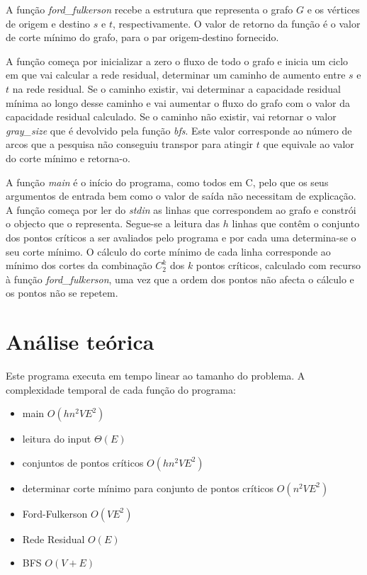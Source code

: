 \documentclass[12pt]{article}
\begin{document}
A função \emph{ford\_fulkerson} recebe a estrutura que representa o grafo $G$ e os vértices de origem e destino $s$ e $t$, respectivamente. O valor de retorno da função é o valor de corte mínimo do grafo, para o par origem-destino fornecido. 

A função começa por inicializar a zero o fluxo de todo o grafo e inicia um ciclo em que vai calcular a rede residual, determinar um caminho de aumento entre $s$ e $t$ na rede residual. Se o caminho existir, vai determinar a capacidade residual mínima ao longo desse caminho e vai aumentar o fluxo do grafo com o valor da capacidade residual calculado. Se o caminho não existir, vai retornar o valor \emph{gray\_size} que é devolvido pela função \emph{bfs}. Este valor corresponde ao número de arcos que a pesquisa não conseguiu transpor para atingir $t$ que equivale ao valor do corte mínimo e retorna-o.


A função \emph{main} é o início do programa, como todos em C, pelo que os seus argumentos de entrada bem como o valor de saída não necessitam de explicação. A função começa por ler do \emph{stdin} as linhas que correspondem ao grafo e constrói o objecto que o representa. 
Segue-se a leitura das $h$ linhas que contêm o conjunto dos pontos críticos a ser avaliados pelo programa e por cada uma determina-se o seu corte mínimo. 
O cálculo do corte mínimo de cada linha corresponde ao mínimo dos cortes da combinação $C_2^k$ dos $k$ pontos críticos, calculado com recurso à função \emph{ford\_fulkerson}, uma vez que a ordem dos pontos não afecta o cálculo e os pontos não se repetem.





\section*{Análise teórica}


Este programa executa em tempo linear ao tamanho do problema. A complexidade temporal de cada função do programa:

\begin{itemize}
  \item main $O(h n^2 V E^2)$
 \item leitura do input $\Theta(E)$
 \item  conjuntos de pontos críticos $O(h n^2 V E^2)$
   \item  determinar corte mínimo para conjunto de pontos críticos $O(n^2 V E^2)$ 
       \item Ford-Fulkerson $O(V E^2)$
           \item Rede Residual $O(E)$
          \item  BFS $O(V+E)$
\end{itemize}
\end{document}
